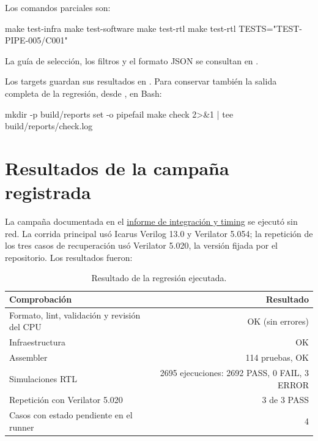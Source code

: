 Los comandos parciales son:

\begin{codebox}[language=bash]
make test-infra
make test-software
make test-rtl
make test-rtl TESTS="TEST-PIPE-005/C001"
\end{codebox}

La guía de selección, los filtros y el formato JSON se consultan en
.

Los targets guardan sus resultados en . Para conservar
también la salida completa de la regresión, desde , en Bash:

\begin{codebox}[language=bash]
mkdir -p build/reports
set -o pipefail
make check 2>&1 | tee build/reports/check.log
\end{codebox}



\section{Resultados de la campaña registrada}

La campaña documentada en el
\href{\projecturl/blob/\baserevision/tp3/reports/issue-16.md}{informe de integración y timing}
se ejecutó sin red. La corrida principal usó Icarus
Verilog 13.0 y Verilator 5.054; la repetición de los tres casos de recuperación
usó Verilator 5.020, la versión fijada por el repositorio. Los resultados
fueron:

\begin{table}[H]
  \centering
  \small
  \begin{tabular}{lr}
    \toprule
    \textbf{Comprobación} & \textbf{Resultado} \\
    \midrule
    Formato, lint, validación y revisión del CPU & OK (sin errores) \\
    Infraestructura & OK \\
    Assembler & 114 pruebas, OK \\
    Simulaciones RTL & 2695 ejecuciones: 2692 PASS, 0 FAIL, 3 ERROR \\
    Repetición con Verilator 5.020 & 3 de 3 PASS \\
    Casos con estado pendiente en el runner & 4 \\
    \bottomrule
  \end{tabular}
  \caption{Resultado de la regresión ejecutada.}
  \label{tab:corrida}
\end{table}


